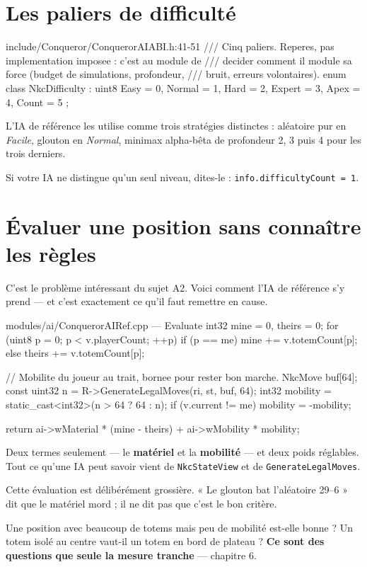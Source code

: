 \section{Les paliers de difficulté}

\begin{nkcode}{include/Conqueror/ConquerorAIABI.h:41-51}
/// Cinq paliers. Reperes, pas implementation imposee : c'est au module de
/// decider comment il module sa force (budget de simulations, profondeur,
/// bruit, erreurs volontaires).
enum class NkcDifficulty : uint8 {
    Easy = 0, Normal = 1, Hard = 2, Expert = 3, Apex = 4, Count = 5
};
\end{nkcode}

L'IA de référence les utilise comme trois stratégies distinctes : aléatoire pur
en \emph{Facile}, glouton en \emph{Normal}, minimax alpha-bêta de profondeur 2, 3
puis 4 pour les trois derniers.

Si votre IA ne distingue qu'un seul niveau, dites-le :
\texttt{info.difficultyCount = 1}.

\section{Évaluer une position sans connaître les règles}

C'est le problème intéressant du sujet A2. Voici comment l'IA de référence s'y
prend — et c'est exactement ce qu'il faut remettre en cause.

\begin{nkcode}{modules/ai/ConquerorAIRef.cpp — Evaluate}
int32 mine = 0, theirs = 0;
for (uint8 p = 0; p < v.playerCount; ++p) {
    if (p == me) mine += v.totemCount[p];
    else         theirs += v.totemCount[p];
}

// Mobilite du joueur au trait, bornee pour rester bon marche.
NkcMove      buf[64];
const uint32 n        = R->GenerateLegalMoves(ri, st, buf, 64);
int32        mobility = static_cast<int32>(n > 64 ? 64 : n);
if (v.current != me) mobility = -mobility;

return ai->wMaterial * (mine - theirs) + ai->wMobility * mobility;
\end{nkcode}

Deux termes seulement — le \textbf{matériel} et la \textbf{mobilité} — et deux
poids réglables. Tout ce qu'une IA peut savoir vient de \texttt{NkcStateView} et
de \texttt{GenerateLegalMoves}.

\begin{nkretenir}
Cette évaluation est délibérément grossière. « Le glouton bat l'aléatoire 29--6 »
dit que le matériel mord ; il ne dit pas que c'est le bon critère.

Une position avec beaucoup de totems mais peu de mobilité est-elle bonne ? Un
totem isolé au centre vaut-il un totem en bord de plateau ? \textbf{Ce sont des
questions que seule la mesure tranche} — chapitre 6.
\end{nkretenir}

